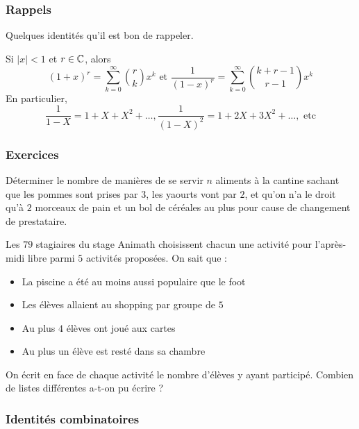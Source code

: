 
\subsubsection{Rappels}
Quelques identités qu'il est bon de rappeler.

\begin{lem}
Si $|x| < 1$ et $r \in \mathbb C$, alors
$$(1 + x)^r = \sum_{k = 0}^\infty \binom r k x^k \text{ et } \frac 1{(1 - x)^r} = \sum_{k = 0}^\infty \binom{k + r - 1}{r - 1} x^k$$
En particulier,
$$\frac 1{1 - X} = 1 + X + X^2 + \dots, \frac 1{(1 - X)^2} = 1 + 2X + 3X^2 + \dots, \text{ etc}$$
\end{lem}


\subsubsection{Exercices}


\begin{exo}
Déterminer le nombre de manières de se servir $n$ aliments à la cantine sachant que les pommes sont prises par $3$, les yaourts vont par $2$, et qu'on n'a le droit qu'à $2$ morceaux de pain et un bol de céréales au plus pour cause de changement de prestataire.
\end{exo}


\begin{exo}
Les $79$ stagiaires du stage Animath choisissent chacun une activité pour l’après-midi libre parmi $5$ activités proposées. On sait que :
\begin{itemize}
\item La piscine a été au moins aussi populaire que le foot
\item Les élèves allaient au shopping par groupe de $5$
\item Au plus $4$ élèves ont joué aux cartes
\item Au plus un élève est resté dans sa chambre
\end{itemize}
On écrit en face de chaque activité le nombre d’élèves y ayant participé. Combien de listes différentes a-t-on pu écrire ?
\end{exo}


\subsubsection{Identités combinatoires}


